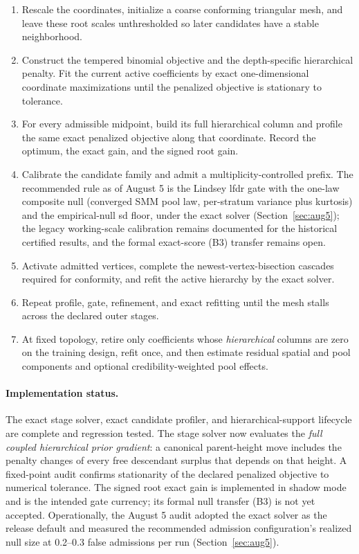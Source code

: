 \documentclass[11pt]{article}
\begin{document}
\begin{enumerate}[leftmargin=2em,itemsep=2pt]
\item Rescale the coordinates, initialize a coarse conforming triangular mesh, and leave these root
scales unthresholded so later candidates have a stable neighborhood.
\item Construct the tempered binomial objective and the depth-specific hierarchical penalty. Fit the
current active coefficients by exact one-dimensional coordinate maximizations until the penalized
objective is stationary to tolerance.
\item For every admissible midpoint, build its full hierarchical column and profile the same exact
penalized objective along that coordinate. Record the optimum, the exact gain, and the signed root
gain.
\item Calibrate the candidate family and admit a multiplicity-controlled prefix. The
recommended rule as of August 5 is the Lindsey lfdr gate with the one-law composite null
(converged SMM pool law, per-stratum variance plus kurtosis) and the empirical-null sd
floor, under the exact solver (Section~\ref{sec:aug5}); the legacy working-scale
calibration remains documented for the historical certified results, and the formal
exact-score (B3) transfer remains open.
\item Activate admitted vertices, complete the newest-vertex-bisection cascades required for
conformity, and refit the active hierarchy by the exact solver.
\item Repeat profile, gate, refinement, and exact refitting until the mesh stalls across the declared
outer stages.
\item At fixed topology, retire only coefficients whose \emph{hierarchical} columns are zero on the
training design, refit once, and then estimate residual spatial and pool components and optional
credibility-weighted pool effects.
\end{enumerate}

\paragraph{Implementation status.} The exact stage solver, exact candidate profiler, and
hierarchical-support lifecycle are complete and regression tested. The stage solver now evaluates
the \emph{full coupled hierarchical prior gradient}: a canonical parent-height move includes the
penalty changes of every free descendant surplus that depends on that height. A fixed-point audit
confirms stationarity of the declared penalized objective to numerical tolerance. The signed root
exact gain is implemented in shadow mode and is the intended gate currency; its formal null
transfer (B3) is not yet accepted. Operationally, the August 5 audit adopted the exact
solver as the release default and measured the recommended admission configuration's
realized null size at 0.2--0.3 false admissions per run (Section~\ref{sec:aug5}).
\end{document}
